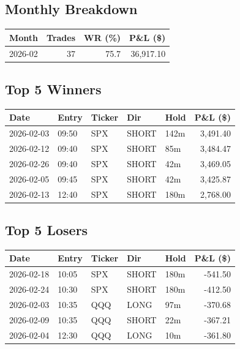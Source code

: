 \documentclass[11pt,a4paper,twoside]{article}
\begin{document}
\subsection*{Monthly Breakdown}
\noindent\begin{center}
\begin{tabular}{>{\color{txtmain}}l rrr}
\toprule
\rowcolor{cardbg}
\textbf{Month} & \textbf{Trades} & \textbf{WR (\%)} & \textbf{P\&L (\$)} \\
\midrule
2026-02 & 37 & 75.7 & \textcolor{wingreen}{36,917.10} \\
\bottomrule
\end{tabular}
\end{center}
\subsection*{Top 5 Winners}
\noindent\begin{center}
\begin{tabular}{>{\color{txtmain}}l llll r}
\toprule
\rowcolor{cardbg}
\textbf{Date} & \textbf{Entry} & \textbf{Ticker} & \textbf{Dir} & \textbf{Hold} & \textbf{P\&L (\$)} \\
\midrule
2026-02-03 & 09:50 & SPX & SHORT & 142m & \textcolor{wingreen}{3,491.40} \\
2026-02-12 & 09:40 & SPX & SHORT & 85m & \textcolor{wingreen}{3,484.47} \\
2026-02-26 & 09:40 & SPX & SHORT & 42m & \textcolor{wingreen}{3,469.05} \\
2026-02-05 & 09:45 & SPX & SHORT & 42m & \textcolor{wingreen}{3,425.87} \\
2026-02-13 & 12:40 & SPX & SHORT & 180m & \textcolor{wingreen}{2,768.00} \\
\bottomrule
\end{tabular}
\end{center}
\subsection*{Top 5 Losers}
\noindent\begin{center}
\begin{tabular}{>{\color{txtmain}}l llll r}
\toprule
\rowcolor{cardbg}
\textbf{Date} & \textbf{Entry} & \textbf{Ticker} & \textbf{Dir} & \textbf{Hold} & \textbf{P\&L (\$)} \\
\midrule
2026-02-18 & 10:05 & SPX & SHORT & 180m & \textcolor{lossred}{-541.50} \\
2026-02-24 & 10:30 & SPX & SHORT & 180m & \textcolor{lossred}{-412.50} \\
2026-02-03 & 10:35 & QQQ & LONG & 97m & \textcolor{lossred}{-370.68} \\
2026-02-09 & 10:35 & QQQ & SHORT & 22m & \textcolor{lossred}{-367.21} \\
2026-02-04 & 12:30 & QQQ & LONG & 10m & \textcolor{lossred}{-361.80} \\
\bottomrule
\end{tabular}
\end{center}
\clearpage
\end{document}
